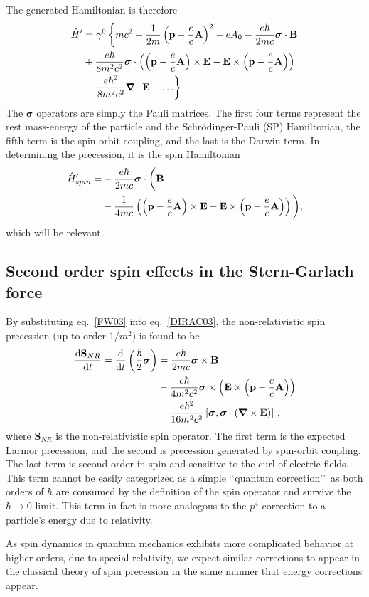 The generated Hamiltonian is therefore
\begin{alignat}{1}
  \notag\hat{H}'&=\gamma^{0}\left\{mc^{2}+\frac{1}{2m}\left(\mathbf{p}-\frac{e}{c}\mathbf{A}\right)^{2}-eA_{0}-\frac{e\hbar}{2mc}\boldsymbol{\sigma}\cdot\mathbf{B}\right.\\
  \notag&+\frac{e\hbar}{8m^{2}c^{2}}\boldsymbol{\sigma}\cdot\left(\left(\mathbf{p}-\frac{e}{c}\mathbf{A}\right)\times\mathbf{E}-\mathbf{E}\times\left(\mathbf{p}-\frac{e}{c}\mathbf{A}\right)\right)\\
  \label{FW02}&-\left.\frac{e\hbar^{2}}{8m^{2}c^{2}}\boldsymbol{\nabla}\cdot\mathbf{E}+\ldots\right\}\,.
\end{alignat}
The $\boldsymbol{\sigma}$ operators are simply the Pauli matrices. The first four terms represent the rest mass-energy of the particle and the Schr\"{o}dinger-Pauli (SP) Hamiltonian, the fifth term is the spin-orbit coupling, and the last is the Darwin term. In determining the precession, it is the spin Hamiltonian
\begin{alignat}{1}
  \notag\hat{H}'_{spin}=&-\frac{e\hbar}{2mc}\boldsymbol{\sigma}\cdot\bigg(\mathbf{B}\\
  \label{FW03}&-\frac{1}{4mc}\left(\left(\mathbf{p}-\frac{e}{c}\mathbf{A}\right)\times\mathbf{E}-\mathbf{E}\times\left(\mathbf{p}-\frac{e}{c}\mathbf{A}\right)\right)\bigg),
\end{alignat}
which will be relevant.

\subsection{Second order spin effects in the Stern-Garlach force}
\label{sec:spinspin}
By substituting eq.~\eqref{FW03} into eq.~\eqref{DIRAC03}, the non-relativistic spin precession (up to order $1/m^{2}$) is found to be
\begin{alignat}{1}
  \notag\frac{\mathrm{d}\mathbf{S}_{NR}}{\mathrm{d}t}=\frac{\mathrm{d}}{\mathrm{d}t}\left(\frac{\hbar}{2}\boldsymbol{\sigma}\right)&=\frac{e\hbar}{2mc}\boldsymbol{\sigma}\times\mathbf{B}\\
  \notag&-\frac{e\hbar}{4m^{2}c^{2}}\boldsymbol{\sigma}\times\left(\mathbf{E}\times\left(\mathbf{p}-\frac{e}{c}\mathbf{A}\right)\right)\\
  \label{SPIN01}&-\frac{e\hbar^{2}}{16m^{2}c^{2}}\left[\boldsymbol{\sigma},\boldsymbol{\sigma}\cdot\left(\boldsymbol{\nabla}\times\mathbf{E}\right)\right]\,,
\end{alignat}
where $\mathbf{S}_{NR}$ is the non-relativistic spin operator. The first term is the expected Larmor precession, and the second is precession generated by spin-orbit coupling. The last term is second order in spin and sensitive to the curl of electric fields. This term cannot be easily categorized as a simple \lq\lq quantum correction\rq\rq\, as both orders of $\hbar$ are consumed by the definition of the spin operator and survive the $\hbar\rightarrow 0$ limit. This term in fact is more analogous to the $p^{4}$ correction to a particle's energy due to relativity.

As spin dynamics in quantum mechanics exhibits more complicated behavior at higher orders, due to special relativity, we expect similar corrections to appear in the classical theory of spin precession in the same manner that energy corrections appear.